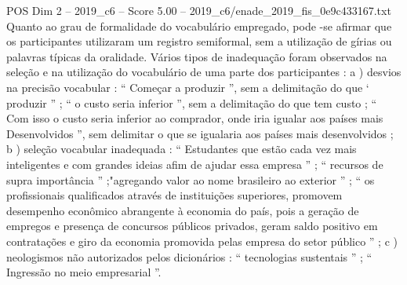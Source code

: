 \begin{textsample}{POS Dim 2 – 2019\_c6 – Score 5.00 – 2019\_c6/enade\_2019\_fis\_0e9c433167.txt}
Quanto ao grau de formalidade do vocabulário empregado, pode -se afirmar que os participantes utilizaram um registro semiformal, sem a utilização de gírias ou palavras típicas da oralidade.
Vários tipos de inadequação foram observados na seleção e na utilização do vocabulário de uma parte dos participantes : a ) desvios na precisão vocabular : “ Começar a produzir ”, sem a delimitação do que ‘ produzir ” ; “ o custo seria inferior ”, sem a delimitação do que tem custo ; “ Com isso o custo seria inferior ao comprador, onde iria igualar aos países mais Desenvolvidos ”, sem delimitar o que se igualaria aos países mais desenvolvidos ; b ) seleção vocabular inadequada : “ Estudantes que estão cada vez mais inteligentes e com grandes ideias afim de ajudar essa empresa ” ; “ recursos de supra importância ” ;"agregando valor ao nome brasileiro ao exterior ” ; “ os profissionais qualificados através de instituições superiores, promovem desempenho econômico abrangente à economia do país, pois a geração de empregos e presença de concursos públicos privados, geram saldo positivo em contratações e giro da economia promovida pelas empresa do setor público ” ; c ) neologismos não autorizados pelos dicionários : “ tecnologias sustentais ” ; “ Ingressão no meio empresarial ”.

\end{textsample}
